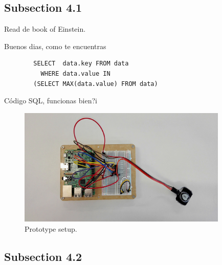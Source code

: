\documentclass[a4paper,12pt]{article}
\begin{document}
\clearpage
\newpage
\begin{appendices}
    
    
    
\end{appendices}

\newpage
\subsection{Subsection 4.1}
\label{subsec:subsec4.1}
\lipsum[8]
Read de book \cite{einstein} of Einstein.

Buenos dias, como te encuentras
\begin{listing}[H]
	\begin{verbatim}
		SELECT  data.key FROM data
		  WHERE data.value IN
		(SELECT MAX(data.value) FROM data)
	\end{verbatim}
	\caption{Código SQL, funcionas bien?i}
	\label{listings:como va esto}
\end{listing}




\begin{figure}[H]
\label{fig:prototype1}
\centering
\includegraphics[width=10cm]{img/Chapter4/prototype1_edited.jpg}
\caption[Prototype setup]{\footnotesize{Prototype setup.}}
\end{figure}

\lipsum[14]

\subsection{Subsection 4.2}
\label{subsec:subsec4.2}
\end{document}
